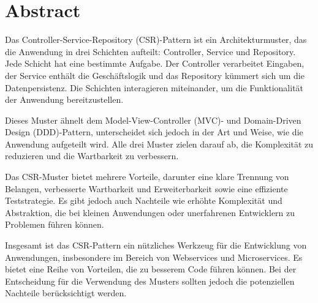 \section*{Abstract}

Das Controller-Service-Repository (CSR)-Pattern ist ein Architekturmuster, das die Anwendung in drei Schichten aufteilt: Controller, Service und Repository. 
Jede Schicht hat eine bestimmte Aufgabe. 
Der Controller verarbeitet Eingaben, der Service enthält die Geschäftslogik und das Repository kümmert sich um die Datenpersistenz. 
Die Schichten interagieren miteinander, um die Funktionalität der Anwendung bereitzustellen.

Dieses Muster ähnelt dem Model-View-Controller (MVC)- und Domain-Driven Design (DDD)-Pattern, unterscheidet sich jedoch in der Art und Weise, wie die Anwendung aufgeteilt wird. 
Alle drei Muster zielen darauf ab, die Komplexität zu reduzieren und die Wartbarkeit zu verbessern.

Das CSR-Muster bietet mehrere Vorteile, darunter eine klare Trennung von Belangen, verbesserte Wartbarkeit und Erweiterbarkeit sowie eine effiziente Teststrategie. 
Es gibt jedoch auch Nachteile wie erhöhte Komplexität und Abstraktion, die bei kleinen Anwendungen oder unerfahrenen Entwicklern zu Problemen führen können.

Insgesamt ist das CSR-Pattern ein nützliches Werkzeug für die Entwicklung von Anwendungen, insbesondere im Bereich von Webservices und Microservices. 
Es bietet eine Reihe von Vorteilen, die zu besserem Code führen können. 
Bei der Entscheidung für die Verwendung des Musters sollten jedoch die potenziellen Nachteile berücksichtigt werden.